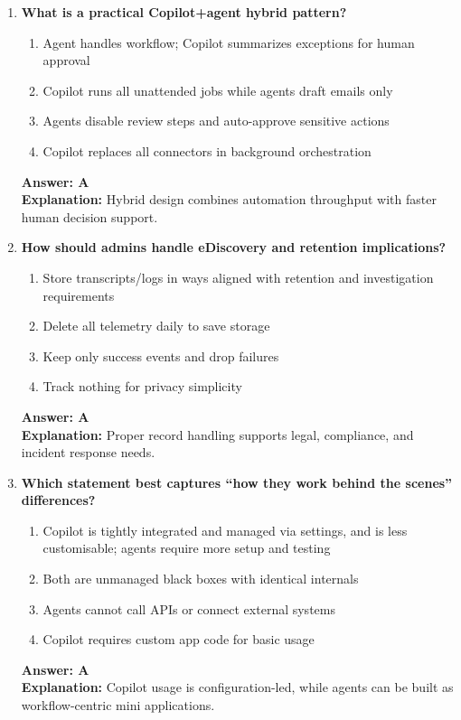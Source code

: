\documentclass[10pt]{article}
\begin{document}
\begin{enumerate}[leftmargin=*]
\item \textbf{What is a practical Copilot+agent hybrid pattern?}
\begin{enumerate}[label=\Alph*.]
  \item Agent handles workflow; Copilot summarizes exceptions for human approval
  \item Copilot runs all unattended jobs while agents draft emails only
  \item Agents disable review steps and auto-approve sensitive actions
  \item Copilot replaces all connectors in background orchestration
\end{enumerate}
\textbf{Answer: A}\\
\textbf{Explanation:} Hybrid design combines automation throughput with faster human decision support.

\item \textbf{How should admins handle eDiscovery and retention implications?}
\begin{enumerate}[label=\Alph*.]
  \item Store transcripts/logs in ways aligned with retention and investigation requirements
  \item Delete all telemetry daily to save storage
  \item Keep only success events and drop failures
  \item Track nothing for privacy simplicity
\end{enumerate}
\textbf{Answer: A}\\
\textbf{Explanation:} Proper record handling supports legal, compliance, and incident response needs.

\item \textbf{Which statement best captures ``how they work behind the scenes'' differences?}
\begin{enumerate}[label=\Alph*.]
  \item Copilot is tightly integrated and managed via settings, and is less customisable; agents require more setup and testing
  \item Both are unmanaged black boxes with identical internals
  \item Agents cannot call APIs or connect external systems
  \item Copilot requires custom app code for basic usage
\end{enumerate}
\textbf{Answer: A}\\
\textbf{Explanation:} Copilot usage is configuration-led, while agents can be built as workflow-centric mini applications.

\end{enumerate}
\end{document}
